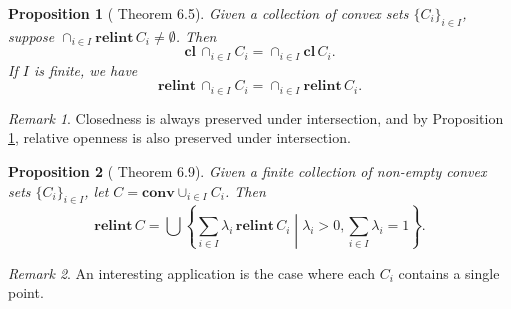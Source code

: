 \documentclass[openany]{book}
\newtheorem{proposition}{Proposition}[chapter]
\theoremstyle{definition}
\theoremstyle{remark}
\newtheorem*{remark}{Remark}
\begin{document}
\begin{proposition}[\cite{R15} Theorem 6.5]\label{prop:clRelIntIntersect}
    Given a collection of convex sets $\{C_i\}_{i\in I}$, suppose $\cap_{i\in I}\mathbf{relint}\,C_i\ne\emptyset$. Then
    \begin{equation*}
        \mathbf{cl}\,\cap_{i\in I}C_i=\cap_{i\in I}\mathbf{cl}\,C_i.
    \end{equation*}
    If $I$ is finite, we have
    \begin{equation*}
        \mathbf{relint}\,\cap_{i\in I}C_i=\cap_{i\in I}\mathbf{relint}\,C_i.
    \end{equation*}
\end{proposition}
\begin{remark}
    Closedness is always preserved under intersection, and by Proposition \ref{prop:clRelIntIntersect}, relative openness is also preserved under intersection.
\end{remark}
\begin{proposition}[\cite{R15} Theorem 6.9]
    Given a finite collection of non-empty convex sets $\{C_i\}_{i\in I}$, let $C=\mathbf{conv}\cup_{i\in I}C_i$. Then
    \begin{equation*}
        \mathbf{relint}\,C=\bigcup\left\{\sum_{i\in I}^{}\lambda_i\,\mathbf{relint}\,C_i\middle|\lambda_i>0,\sum_{i\in I}^{}\lambda_i=1\right\}.
    \end{equation*}
\end{proposition}
\begin{remark}
    An interesting application is the case where each $C_i$ contains a single point.
\end{remark}
\end{document}
